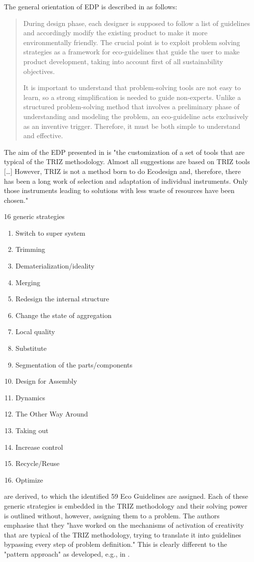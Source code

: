 \documentclass[11pt,a4paper]{article}
\begin{document}
The general orientation of EDP is described in \cite[p. 3]{Russo2020} as
follows:
\begin{quote}
  During design phase, each designer is supposed to follow a list of
  guidelines and accordingly modify the existing product to make it more
  environmentally friendly. The crucial point is to exploit problem solving
  strategies as a framework for eco-guidelines that guide the user to make
  product development, taking into account first of all sustainability
  objectives.

  It is important to understand that problem-solving tools are not easy to
  learn, so a strong simplification is needed to guide non-experts. Unlike a
  structured problem-solving method that involves a preliminary phase of
  understanding and modeling the problem, an eco-guideline acts exclusively as
  an inventive trigger. Therefore, it must be both simple to understand and
  effective.
\end{quote}

The aim of the EDP presented in \cite{Russo2020} is "the customization of a
set of tools that are typical of the TRIZ methodology. Almost all suggestions
are based on TRIZ tools [\ldots] However, TRIZ is not a method born to do
Ecodesign and, therefore, there has been a long work of selection and
adaptation of individual instruments. Only those instruments leading to
solutions with less waste of resources have been chosen."

16 generic strategies 
\begin{enumerate}
\item Switch to super system
\item Trimming
\item Dematerialization/ideality
\item Merging
\item Redesign the internal structure
\item Change the state of aggregation
\item Local quality
\item Substitute
\item Segmentation of the parts/components
\item Design for Assembly
\item Dynamics
\item The Other Way Around
\item Taking out
\item Increase control
\item Recycle/Reuse
\item Optimize
\end{enumerate}
are derived, to which the identified 59 Eco Guidelines are assigned. Each of
these generic strategies is embedded in the TRIZ methodology and their solving
power is outlined without, however, assigning them to a problem.  The authors
emphasise that they "have worked on the mechanisms of activation of creativity
that are typical of the TRIZ methodology, trying to translate it into
guidelines bypassing every step of problem definition." This is clearly
different to the "pattern approach" as developed, e.g., in \cite{LF2018}.
\end{document}
